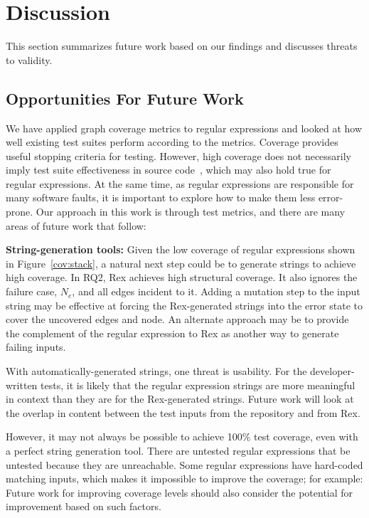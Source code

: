 \section{Discussion}
\label{sec:discussion}
This section summarizes future work based on our findings and discusses threats to validity.
\subsection{Opportunities For Future Work}
We have applied graph coverage metrics to regular expressions and looked at how well existing test suites perform according to the metrics. 
Coverage provides useful stopping criteria for testing. 
However, high coverage does not necessarily imply test suite effectiveness in source code~\cite{coveragetestsuitecorrelation}, which may also hold true for regular expressions. 
At the same time, as regular expressions are responsible for many software faults, it is important to explore how to make them less error-prone. Our approach in this work is through test metrics, and there are many areas of future work that follow:

\textbf{String-generation tools: } 
Given the low coverage of regular expressions shown in Figure~\ref{cov:stack}, a natural next step could be to generate strings to achieve high coverage. 
In RQ2, Rex achieves high structural coverage. %
It also ignores the failure case, $N_e$, and all edges incident to it. 
Adding a mutation step to the input string may be effective at forcing the Rex-generated strings into the error state to cover the uncovered edges and node. An alternate approach may be to provide the complement of the regular expression to Rex as another way to generate failing inputs. 

With automatically-generated strings, one threat is usability. For the developer-written tests, it is likely that the regular expression strings are more meaningful in context than they are for the Rex-generated strings. Future work will look at the overlap in content between the test inputs from the repository and from Rex. 

However, it may not always be possible to achieve 100\% test coverage, even with a perfect string generation tool. There are untested regular expressions that be untested because they are unreachable. Some regular expressions have hard-coded matching inputs, which makes it impossible to improve the coverage; for example: 
Future work for improving coverage levels should also consider the potential for improvement based on such factors. 

